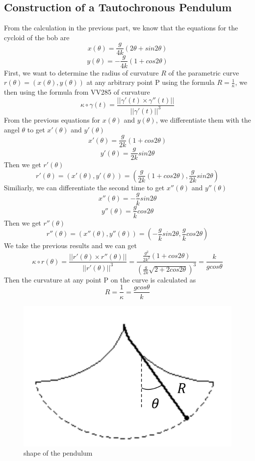 \documentclass[12pt,a4paper]{article}
\begin{document}
\subsection{Construction of a Tautochronous Pendulum}
From the calculation in the previous part, we know that the equations for the cycloid of the bob are
$$x(\theta) = \frac{g}{4k}(2\theta+sin2\theta)$$
$$y(\theta) = -\frac{g}{4k}(1+cos2\theta)$$
First, we want to determine the radius of curvature $R$ of the parametric curve $r(\theta) = (x(\theta),y(\theta))$ at any arbitrary point P using the formula $R = \frac{1}{\kappa}$, we then using the formula from VV285 of curvature
\begin{equation}
    \kappa\circ\gamma(t) = \frac{||\gamma'(t)\times\gamma''(t)||}{||\gamma'(t)||^3}
\end{equation}
From the previous equations for $x(\theta)$ and $y(\theta)$, we differentiate them with the angel $\theta$ to get $x'(\theta)$ and $y'(\theta)$ 
$$x'(\theta) = \frac{g}{2k}(1+cos2\theta)$$
$$y'(\theta) = \frac{g}{2k}sin2\theta$$
Then we get $r'(\theta)$
$$r'(\theta) = (x'(\theta),y'(\theta)) = (\frac{g}{2k}(1+cos2\theta),\frac{g}{2k}sin2\theta)$$
Similiarly, we can differentiate the second time to get $x''(\theta)$ and $y''(\theta)$ 
$$x''(\theta) = -\frac{g}{k}sin2\theta$$
$$y''(\theta) = \frac{g}{k}cos2\theta$$
Then we get $r''(\theta)$
$$r''(\theta) = (x''(\theta),y''(\theta)) = (-\frac{g}{k}sin2\theta,\frac{g}{k}cos2\theta)$$
We take the previous results and we can get
$$\kappa\circ{r(\theta)} = \frac{||r'(\theta)\times{r''(\theta)}||}{||r'(\theta)||^3} = \frac{\frac{g^2}{2k^2}(1+cos2\theta)}{(\frac{g}{2k}\sqrt{2+2cos2\theta})^3} = \frac{k}{gcos\theta}$$
Then the curvature at any point P on the curve is calculated as
\begin{equation}
    R = \frac{1}{\kappa} = \frac{gcos\theta}{k}
\end{equation}
\begin{figure}[!htbp]
    \centering
    \includegraphics[scale=0.35]{3.png}
    \caption{shape of the pendulum}
\end{figure}
\end{document}

